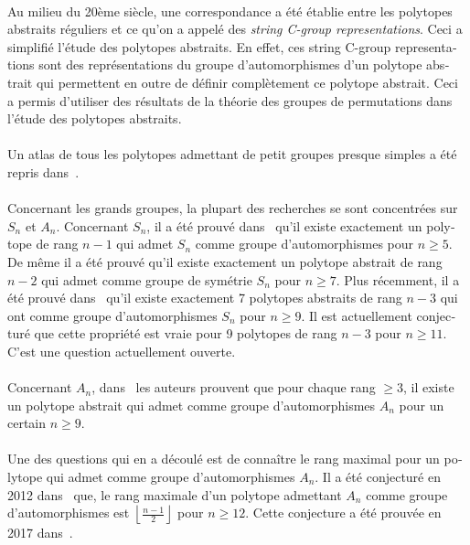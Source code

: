 \begin{otherlanguage}{french}
\paragraph{}
Au milieu du 20ème siècle, une correspondance a été établie entre les polytopes abstraits réguliers et ce qu'on a appelé des \textit{string C-group representations}. Ceci a simplifié l'étude des polytopes abstraits. En effet, ces string C-group representations sont des représentations du groupe d'automorphismes d'un polytope abstrait qui permettent en outre de définir complètement ce polytope abstrait. Ceci a permis d'utiliser des résultats de la théorie des groupes de permutations dans l'étude des polytopes abstraits.

\paragraph{}
Un atlas de tous les polytopes admettant de petit groupes presque simples a été repris dans~\cite{atlasPolytopes}.

\paragraph{}
Concernant les grands groupes, la plupart des recherches se sont concentrées sur $S_n$ et $A_n$. Concernant $S_n$, il a été prouvé dans~\cite{highRankSym} qu'il existe exactement un polytope de rang $n-1$ qui admet $S_n$ comme groupe d'automorphismes pour $n \ge 5$. De même il a été prouvé qu'il existe exactement un polytope abstrait de rang $n-2$ qui admet comme groupe de symétrie $S_n$ pour $n \ge 7$. Plus récemment, il a été prouvé dans~\cite{leemansTransactions} qu'il existe exactement 7 polytopes abstraits de rang $n-3$ qui ont comme groupe d'automorphismes $S_n$ pour $n \ge 9$. Il est actuellement conjecturé que cette propriété est vraie pour 9 polytopes de rang $n-3$ pour $n \ge 11$. C'est une question actuellement ouverte.

\paragraph{}
Concernant $A_n$, dans~\cite{highRankAlternating} les auteurs prouvent que pour chaque rang $\ge 3$, il existe un polytope abstrait qui admet comme groupe d'automorphismes $A_n$ pour un certain $n \ge 9$.

\paragraph{}
Une des questions qui en a découlé est de connaître le rang maximal pour un polytope qui admet comme groupe d'automorphismes $A_n$. Il a été conjecturé en 2012 dans~\cite{highRankAlternating} que, le rang maximale d'un polytope admettant $A_n$ comme groupe d'automorphismes est $\left\lfloor\frac{n-1}{2}\right\rfloor$ pour $n \ge 12$. Cette conjecture a été prouvée en 2017 dans~\cite{highestRankOfAn}.


\end{otherlanguage}
